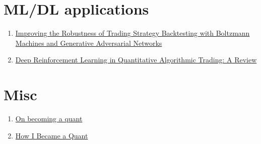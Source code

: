 \documentclass[a4paper, 12pt]{article}
\begin{document}
\section*{ML/DL applications}
\begin{enumerate}
\item \href{http://thierry-roncalli.com/download/rbm_gan_backtesting.pdf}{Improving the Robustness of Trading Strategy Backtesting with Boltzmann Machines and Generative Adversarial Networks}

\item \href{https://arxiv.org/pdf/2106.00123.pdf}{Deep Reinforcement Learning in Quantitative Algorithmic Trading: A Review}
\end{enumerate}

\section*{Misc}
\begin{enumerate}
	
	\item \href{https://www.maths.usyd.edu.au/u/UG/SM/MATH3075/r/Joshi_2008.pdf}{On becoming a quant}
	\item \href{https://engineering.nyu.edu/sites/default/files/2021-10/How_I_Became_a_Quant\%20\%281\%29.pdf}{How I Became a Quant}
\end{enumerate}
\end{document}
